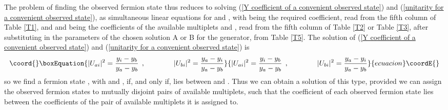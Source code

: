 \documentclass[a4paper,12pt,oneside]{article}
\begin{document}
The problem of finding the observed fermion state \coordHE{} thus reduces
to solving (\ref{Y coefficient of a convenient observed state}) and
(\ref{unitarity for a convenient observed state}), as simultaneous
linear equations for \coordHE{} and
\coordHE{}, with \coordHE{} being the required \coordHE{} 
coefficient, read from the fifth column of Table \ref{T1}, and \coordHE{}
and \coordHE{} being the \coordHE{} coefficients of the available multiplets \coordHE{}
and \coordHE{}, read from the fifth column of Table \ref{T2} or Table
\ref{T3}, after substituting in the parameters of the chosen 
solution A or B for the \coordHE{} generator, from Table 
\ref{T5}.  The solution of
(\ref{Y coefficient of a convenient observed state}) and
(\ref{unitarity for a convenient observed state}) is
\begin{equation}\coord{}\boxEquation{\label{solution of the two equations}
\vert U_{ai}\vert^2=\frac{y_i-y_b}{y_a-y_b}\:\:,
\qquad\qquad
\vert U_{bi}\vert^2=\frac{y_a-y_i}{y_a-y_b}
}{\vert U_{ai}\vert^2=\frac{y_i-y_b}{y_a-y_b}\:\:,
\qquad\qquad
\vert U_{bi}\vert^2=\frac{y_a-y_i}{y_a-y_b}
}{ecuacion}\coordE{}\end{equation}
so we find a fermion state \coordHE{}, with \coordHE{} and
\coordHE{}, if, and only if,
\coordHE{} lies between \coordHE{} and \coordHE{}.  Thus we can obtain a solution
of this type, provided we can assign the observed fermion
states to mutually disjoint pairs of available multiplets,
such that the \coordHE{} coefficient of each observed fermion state lies
between the \coordHE{} coefficients of the pair of available multiplets it
is assigned to.
\end{document}
